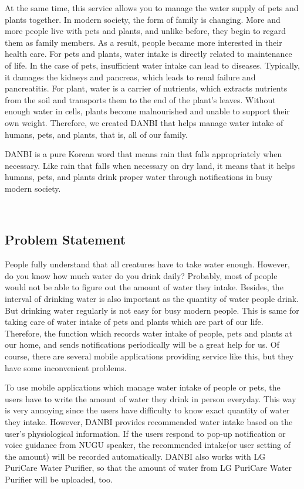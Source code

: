 \documentclass[conference]{IEEEtran}
\begin{document}
At the same time, this service allows you to manage the water supply of pets and plants together. In modern society, the form of family is changing. More and more people live with pets and plants, and unlike before, they begin to regard them as family members. As a result, people became more interested in their health care. For pets and plants, water intake is directly related to maintenance of life. In the case of pets, insufficient water intake can lead to diseases. Typically, it damages the kidneys and pancreas, which leads to renal failure and pancreatitis. For plant, water is a carrier of nutrients, which extracts nutrients from the soil and transports them to the end of the plant's leaves. Without enough water in cells, plants become malnourished and unable to support their own weight. Therefore, we created DANBI that helps manage water intake of humans, pets, and plants, that is, all of our family.

DANBI is a pure Korean word that means rain that falls appropriately when necessary. Like rain that falls when necessary on dry land, it means that it helps humans, pets, and plants drink proper water through notifications in busy modern society.

\ 
\subsection{Problem Statement}
\setlength{\parindent}{2ex}
People fully understand that all creatures have to take water enough. However, do you know how much water do you drink daily? Probably, most of people would not be able to figure out the amount of water they intake. Besides, the interval of drinking water is also important as the quantity of water people drink. But drinking water regularly is not easy for busy modern people. This is same for taking care of water intake of pets and plants which are part of our life. Therefore, the function which records water intake of people, pets and plants at our home, and sends notifications periodically will be a great help for us. Of course, there are several mobile applications providing service like this, but they have some inconvenient problems.

To use mobile applications which manage water intake of people or pets, the users have to write the amount of water they drink in person everyday. This way is very annoying since the users have difficulty to know exact quantity of water they intake. However, DANBI provides recommended water intake based on the user's physiological information. If the users respond to pop-up notification or voice guidance from NUGU speaker, the recommended intake(or user setting of the amount) will be recorded automatically. DANBI also works with LG PuriCare Water Purifier, so that the amount of water from LG PuriCare Water Purifier will be uploaded, too.
\end{document}
